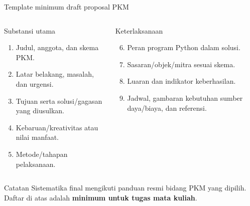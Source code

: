 \documentclass[aspectratio=169,11pt]{beamer}
\begin{document}
\begin{frame}{Template minimum draft proposal PKM}
\small
\begin{columns}[T]
\begin{block}{Substansi utama}
\begin{enumerate}
  \item Judul, anggota, dan skema PKM.
  \item Latar belakang, masalah, dan urgensi.
  \item Tujuan serta solusi/gagasan yang diusulkan.
  \item Kebaruan/kreativitas atau nilai manfaat.
  \item Metode/tahapan pelaksanaan.
\end{enumerate}
\end{block}
\begin{block}{Keterlaksanaan}
\begin{enumerate}
  \setcounter{enumi}{5}
  \item Peran program Python dalam solusi.
  \item Sasaran/objek/mitra sesuai skema.
  \item Luaran dan indikator keberhasilan.
  \item Jadwal, gambaran kebutuhan sumber daya/biaya, dan referensi.
\end{enumerate}
\end{block}
\end{columns}
\vspace{1mm}
\begin{alertblock}{Catatan}
\footnotesize Sistematika final mengikuti panduan resmi bidang PKM yang dipilih. Daftar di atas adalah \textbf{minimum untuk tugas mata kuliah}.
\end{alertblock}
\end{frame}
\end{document}
